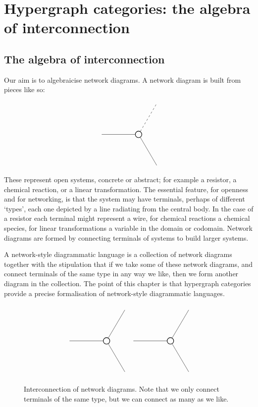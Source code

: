 \chapter[Hypergraph categories: the algebra of interconnection]{Hypergraph
categories: the algebra of interconnection}

\section{The algebra of interconnection}

Our aim is to algebraicise network diagrams. A network diagram is built from
pieces like so:
\[
  \begin{tikzpicture}
    \node [draw,circle,thick] (s) at (0,0) {};
    \node (a) at (-2,0) {};
    \node (b) at (1,1.7) {};
    \node (c) at (1,-1.7) {};
    \draw (s) to (a);
    \draw [dashed] (s) to (b);
    \draw (s) to (c);
  \end{tikzpicture}
\]
These represent open systems, concrete or abstract; for example a resistor, a
chemical reaction, or a linear transformation. The essential feature, for
openness and for networking, is that the system may have terminals, perhaps of
different `types', each one depicted by a line radiating from the central body.
In the case of a resistor each terminal might represent a wire, for chemical
reactions a chemical species, for linear transformations a variable in the
domain or codomain.  Network diagrams are formed by connecting terminals of
systems to build larger systems.

A network-style diagrammatic language is a collection of network diagrams
together with the stipulation that if we take some of these network diagrams,
and connect terminals of the same type in any way we like, then we form
another diagram in the collection.  The point of this chapter is that hypergraph
categories provide a precise formalisation of network-style diagrammatic
languages.  

\begin{figure}
\[
  \begin{tikzpicture}
    \node [draw,circle,thick] (s) at (0,0) {};
    \node (a) at (-2,0) {};
    \node (b) at (1,1.7) {};
    \node (c) at (1,-1.7) {};
    \draw (s) to (a);
    \draw (s) to (b);
    \draw (s) to (c);
  \end{tikzpicture}
  \begin{tikzpicture}
    \node [draw,circle,thick] (s) at (0,0) {};
    \node (a) at (-2,0) {};
    \node (b) at (1,1.7) {};
    \node (c) at (1,-1.7) {};
    \draw (s) to (a);
    \draw (s) to (b);
    \draw (s) to (c);
  \end{tikzpicture}
\]
\caption{Interconnection of network diagrams. Note that we only connect
terminals of the same type, but we can connect as many as we like.}
\end{figure}

